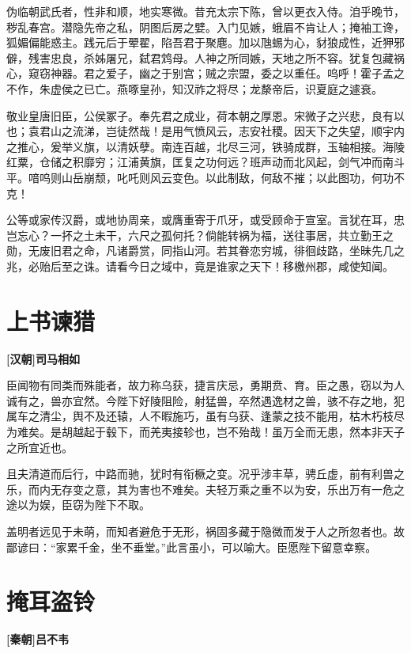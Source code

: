 \documentclass[UTF8,titlepage,oneside]{ctexbook}
\begin{document}
伪临朝武氏者，性非和顺，地实寒微。昔充太宗下陈，曾以更衣入侍。洎乎晚节，秽乱春宫。潜隐先帝之私，阴图后房之嬖。入门见嫉，蛾眉不肯让人；掩袖工谗，狐媚偏能惑主。践元后于翚翟，陷吾君于聚麀。加以虺蜴为心，豺狼成性，近狎邪僻，残害忠良，杀姊屠兄，弑君鸩母。人神之所同嫉，天地之所不容。犹复包藏祸心，窥窃神器。君之爱子，幽之于别宫；贼之宗盟，委之以重任。呜呼！霍子孟之不作，朱虚侯之已亡。燕啄皇孙，知汉祚之将尽；龙漦帝后，识夏庭之遽衰。

敬业皇唐旧臣，公侯冢子。奉先君之成业，荷本朝之厚恩。宋微子之兴悲，良有以也；袁君山之流涕，岂徒然哉！是用气愤风云，志安社稷。因天下之失望，顺宇内之推心，爰举义旗，以清妖孽。南连百越，北尽三河，铁骑成群，玉轴相接。海陵红粟，仓储之积靡穷；江浦黄旗，匡复之功何远？班声动而北风起，剑气冲而南斗平。喑呜则山岳崩颓，叱吒则风云变色。以此制敌，何敌不摧；以此图功，何功不克！

公等或家传汉爵，或地协周亲，或膺重寄于爪牙，或受顾命于宣室。言犹在耳，忠岂忘心？一抔之土未干，六尺之孤何托？倘能转祸为福，送往事居，共立勤王之勋，无废旧君之命，凡诸爵赏，同指山河。若其眷恋穷城，徘徊歧路，坐昧先几之兆，必贻后至之诛。请看今日之域中，竟是谁家之天下！移檄州郡，咸使知闻。


\chapter*{上书谏猎}
\begin{center}
	\textbf{[汉朝]司马相如}
\end{center}

臣闻物有同类而殊能者，故力称乌获，捷言庆忌，勇期贲、育。臣之愚，窃以为人诚有之，兽亦宜然。今陛下好陵阻险，射猛兽，卒然遇逸材之兽，骇不存之地，犯属车之清尘，舆不及还辕，人不暇施巧，虽有乌获、逢蒙之技不能用，枯木朽枝尽为难矣。是胡越起于毂下，而羌夷接轸也，岂不殆哉！虽万全而无患，然本非天子之所宜近也。

且夫清道而后行，中路而驰，犹时有衔橛之变。况乎涉丰草，骋丘虚，前有利兽之乐，而内无存变之意，其为害也不难矣。夫轻万乘之重不以为安，乐出万有一危之途以为娱，臣窃为陛下不取。

盖明者远见于未萌，而知者避危于无形，祸固多藏于隐微而发于人之所忽者也。故鄙谚曰：“家累千金，坐不垂堂。”此言虽小，可以喻大。臣愿陛下留意幸察。


\chapter*{掩耳盗铃}
\begin{center}
	\textbf{[秦朝]吕不韦}
\end{center}
\end{document}

